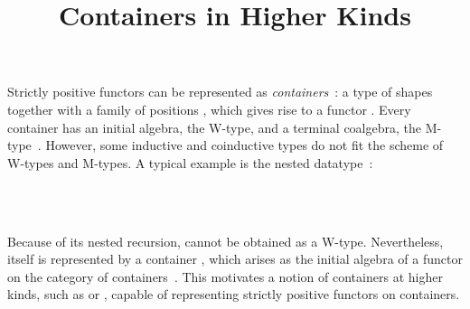 \documentclass{article}
\title{Containers in Higher Kinds}
\begin{document}
\maketitle

Strictly positive functors can be represented as \emph{containers}~\cite{containers}: a type of shapes \;\AgdaSymbol{:}\; together with a family of positions \;\AgdaSymbol{:}\;\;\;, which gives rise to a functor \;\;\;\;\;\AgdaSymbol{:}\;\;\;. Every container has an initial algebra, the W-type, and a terminal coalgebra, the M-type~\cite{containers,ahrens2015nonwellfounded}. However, some inductive and coinductive types do not fit the scheme of W-types and M-types. A typical example is the nested datatype~\cite{bird1998nested}:

\begin{code}%
\>[0]\AgdaSpace{}%
\AgdaSpace{}%
\AgdaSymbol{(}\AgdaSpace{}%
\AgdaSymbol{:}\AgdaSpace{}%
\AgdaSymbol{)}\AgdaSpace{}%
\AgdaSymbol{:}\AgdaSpace{}%
\AgdaSpace{}%
\<%
\\
\>[0][@{}l@{\AgdaIndent{0}}]%
\>[2]\AgdaInductiveConstructor{[]}\AgdaSpace{}%
\AgdaSymbol{:}\AgdaSpace{}%
\AgdaSpace{}%
\<%
\\
%
\>[2]\AgdaOperator{\AgdaInductiveConstructor{\AgdaUnderscore{}::\AgdaUnderscore{}}}\AgdaSpace{}%
\AgdaSymbol{:}\AgdaSpace{}%
\AgdaSpace{}%
\AgdaSpace{}%
\AgdaSpace{}%
\AgdaSymbol{(}\AgdaSpace{}%
\AgdaSymbol{)}\AgdaSpace{}%
\AgdaSpace{}%
\AgdaSpace{}%
\<%
\end{code}

Because of its nested recursion, \; cannot be obtained as a W-type. Nevertheless,  itself is represented by a container \;\AgdaSymbol{:}\;, which arises as the initial algebra of a functor on the category of containers~\cite{bird1998nested,bird1999generalised,johann2007initial}. This motivates a notion of containers at higher kinds, such as \AgdaSymbol{(}\AgdaInductiveConstructor{*}\;\;\AgdaInductiveConstructor{*}\AgdaSymbol{)}\;\;\AgdaInductiveConstructor{*}\;\;\AgdaInductiveConstructor{*} or \AgdaSymbol{(}\AgdaInductiveConstructor{*}\;\;\AgdaInductiveConstructor{*}\AgdaSymbol{)}\;\;\AgdaInductiveConstructor{*}, capable of representing strictly positive functors on containers.
\end{document}
